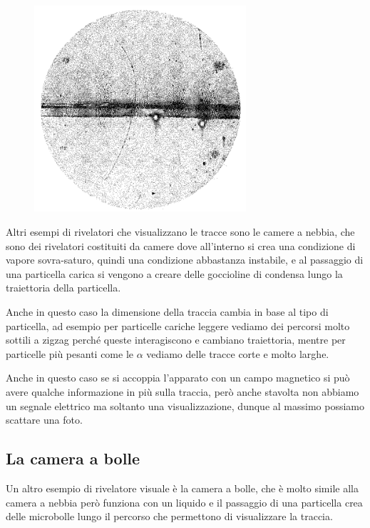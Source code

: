 \begin{minipage}{0.36\textwidth}
   \begin{figure}[H]
      \centering
      \includegraphics[width=0.7\textwidth]{immagini/camera_a_nebbia.png}
   \end{figure}
\end{minipage}
\begin{minipage}{0.63\textwidth}
   \vspace{0.7cm}Altri esempi di rivelatori che visualizzano le tracce sono le camere a nebbia, che sono dei rivelatori costituiti da camere dove all'interno si crea una condizione di vapore sovra-saturo, quindi una condizione abbastanza instabile, e al passaggio di una particella carica si vengono a creare delle goccioline di condensa lungo la traiettoria della particella.
\end{minipage}

\vspace{0.5cm}Anche in questo caso la dimensione della traccia cambia in base al tipo di particella, ad esempio per particelle cariche leggere vediamo dei percorsi molto sottili a zigzag perché queste interagiscono e cambiano traiettoria, mentre per particelle più pesanti come le $\alpha$ vediamo delle tracce corte e molto larghe.

Anche in questo caso se si accoppia l'apparato con un campo magnetico si può avere qualche informazione in più sulla traccia, però anche stavolta non abbiamo un segnale elettrico ma soltanto una visualizzazione, dunque al massimo possiamo scattare una foto.

\subsection{La camera a bolle}
Un altro esempio di rivelatore visuale è la camera a bolle, che è molto simile alla camera a nebbia però funziona con un liquido e il passaggio di una particella crea delle microbolle lungo il percorso che permettono di visualizzare la traccia.

